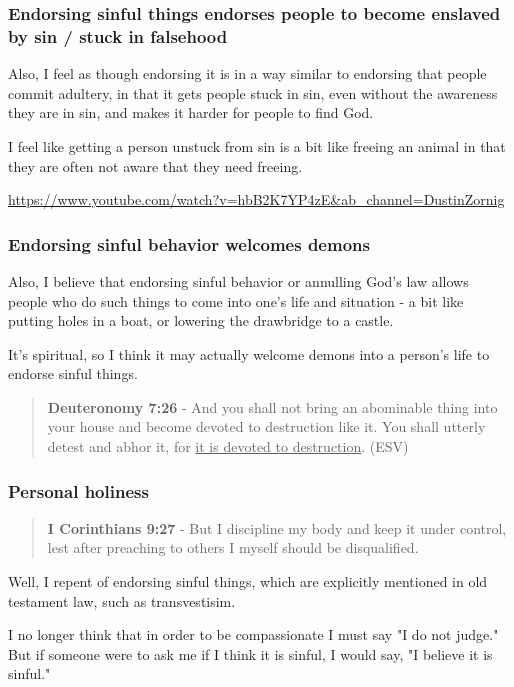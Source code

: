 \documentclass[11pt]{article}
\begin{document}
\subsubsection{Endorsing sinful things endorses people to become enslaved by sin / stuck in falsehood}
\label{sec:org6c8c59b}
Also, I feel as though endorsing it is in a
way similar to endorsing that people commit
adultery, in that it gets people stuck in sin,
even without the awareness they are in sin,
and makes it harder for people to find God.

I feel like getting a person unstuck from sin
is a bit like freeing an animal in that they
are often not aware that they need freeing.

\url{https://www.youtube.com/watch?v=hbB2K7YP4zE\&ab\_channel=DustinZornig}

\subsubsection{Endorsing sinful behavior welcomes demons}
\label{sec:org2368830}
Also, I believe that endorsing sinful behavior
or annulling God's law allows people who do
such things to come into one's life and
situation - a bit like putting holes in a
boat, or lowering the drawbridge to a castle.

It's spiritual, so I think it may actually
welcome demons into a person's life to endorse
sinful things.

\begin{quote}
\textbf{Deuteronomy 7:26} - And you shall not bring an abominable thing into your house and become devoted to destruction like it. You shall utterly detest and abhor it, for \uline{it is devoted to destruction}.  (ESV)
\end{quote}

\subsubsection{Personal holiness}
\label{sec:orgd28a2ce}
\begin{quote}
\textbf{I Corinthians 9:27} - But I discipline my body and keep it under control, lest after preaching to others I myself should be disqualified.
\end{quote}

Well, I repent of endorsing sinful things,
which are explicitly mentioned in old
testament law, such as transvestisim.

I no longer think that in order to be compassionate I must say "I do not judge."
But if someone were to ask me if I think it is sinful, I would say, "I believe it is sinful."
\end{document}

